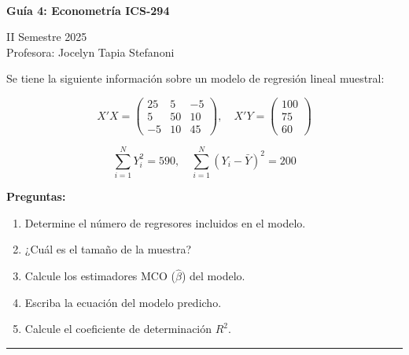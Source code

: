 \documentclass[10pt,a4paper]{article}
\begin{document}
\vspace{5cm}



\begin{center}
\begin{large}
\textbf{\\Guía 4: Econometría ICS-294}
\end{large}
\end{center}

\begin{center}
II Semestre 2025\\
Profesora: Jocelyn Tapia Stefanoni
\end{center}

Se tiene la siguiente información sobre un modelo de regresión lineal muestral:

\[
X'X = \begin{pmatrix}
25 & 5 & -5 \\
5 & 50 & 10 \\
-5 & 10 & 45
\end{pmatrix}, \quad
X'Y = \begin{pmatrix}
100 \\
75 \\
60
\end{pmatrix}
\]

\[
\sum_{i=1}^{N} Y_i^2 = 590, \quad \sum_{i=1}^{N} (Y_i - \bar{Y})^2 = 200
\]

\vspace{0.5cm}

\textbf{Preguntas:}

\begin{enumerate}
    \item[(1)] Determine el número de regresores incluidos en el modelo.
    
    \item[(2)] ¿Cuál es el tamaño de la muestra?
    
    \item[(3)] Calcule los estimadores MCO (\( \hat{\beta} \)) del modelo.
    
    \item[(4)] Escriba la ecuación del modelo predicho.
    
    \item[(5)] Calcule el coeficiente de determinación \( R^2 \).
\end{enumerate}

\vspace{1cm}
\hrule
\vspace{0.5cm}
\end{document}
